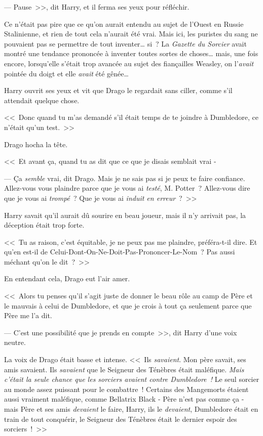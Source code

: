 --- Pause~>>, dit Harry, et il ferma ses yeux pour réfléchir.

Ce n'était pas pire que ce qu'on aurait entendu au sujet de l'Ouest en Russie Stalinienne, et rien de tout cela n'aurait été vrai. Mais ici, les puristes du sang ne pouvaient pas se permettre de tout inventer… si~? La \emph{Gazette du Sorcier} avait montré une tendance prononcée à inventer toutes sortes de choses… mais, une fois encore, lorsqu'elle s'était trop avancée au sujet des fiançailles Weasley, on l'\emph{avait} pointée du doigt et elle \emph{avait} été gênée…

Harry ouvrit ses yeux et vit que Drago le regardait sans ciller, comme s'il attendait quelque chose.

<<~Donc quand tu m'as demandé s'il était temps de te joindre à Dumbledore, ce n'était qu'un test.~>>

Drago hocha la tête.

<<~Et avant ça, quand tu as dit que ce que je disais semblait vrai -

--- Ça \emph{semble} vrai, dit Drago. Mais je ne sais pas si je peux te faire confiance. Allez-vous vous plaindre parce que je vous ai \emph{testé}, M. Potter~? Allez-vous dire que je vous ai \emph{trompé}~? Que je vous ai \emph{induit en erreur}~?~>>

Harry savait qu'il aurait dû sourire en beau joueur, mais il n'y arrivait pas, la déception était trop forte.

<<~Tu as raison, c'est équitable, je ne peux pas me plaindre, préféra-t-il dire. Et qu'en est-il de Celui-Dont-On-Ne-Doit-Pas-Prononcer-Le-Nom~? Pas aussi méchant qu'on le dit~?~>>

En entendant cela, Drago eut l'air amer.

<<~Alors tu penses qu'il s'agit juste de donner le beau rôle au camp de Père et le mauvais à celui de Dumbledore, et que je crois à tout ça seulement parce que Père me l'a dit.

--- C'est une possibilité que je prends en compte~>>, dit Harry d'une voix neutre.

La voix de Drago était basse et intense. <<~Ils \emph{savaient}. Mon père savait, ses amis savaient. Ils \emph{savaient} que le Seigneur des Ténèbres était maléfique. \emph{Mais c'était la seule chance que les sorciers avaient contre Dumbledore~!} Le seul sorcier au monde assez puissant pour le combattre~! Certains des Mangemorts étaient aussi vraiment maléfique, comme Bellatrix Black - Père n'est pas comme ça - mais Père et ses amis \emph{devaient} le faire, Harry, ils le \emph{devaient}, Dumbledore était en train de tout conquérir, le Seigneur des Ténèbres était le dernier espoir des sorciers~!~>>

